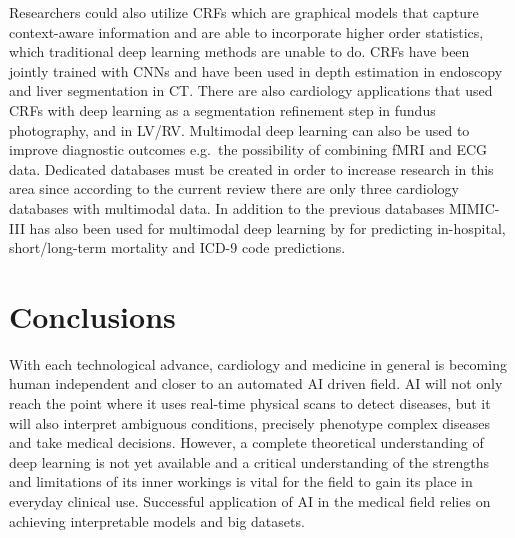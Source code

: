 \documentclass[journal]{IEEEtran}
\begin{document}
Researchers could also utilize CRFs which are graphical models that capture context-aware information and are able to incorporate higher order statistics, which traditional deep learning methods are unable to do.
CRFs have been jointly trained with CNNs and have been used in depth estimation in endoscopy\cite{mahmood2018deep} and liver segmentation in CT\cite{christ2016automatic}.
There are also cardiology applications that used CRFs with deep learning as a segmentation refinement step in fundus photography\cite{zhou2017improving, fu2016retinal}, and in LV/RV\cite{bai2017semi}.
Multimodal deep learning\cite{ngiam2011multimodal} can also be used to improve diagnostic outcomes e.g.\ the possibility of combining fMRI and ECG data.
Dedicated databases must be created in order to increase research in this area since according to the current review there are only three cardiology databases with multimodal data.
In addition to the previous databases MIMIC-III has also been used for multimodal deep learning by \cite{purushotham2018benchmarking} for predicting in-hospital, short/long-term mortality and ICD-9 code predictions.

\section*{Conclusions}
With each technological advance, cardiology and medicine in general is becoming human independent and closer to an automated AI driven field.
AI will not only reach the point where it uses real-time physical scans to detect diseases, but it will also interpret ambiguous conditions, precisely phenotype complex diseases and take medical decisions.
However, a complete theoretical understanding of deep learning is not yet available and a critical understanding of the strengths and limitations of its inner workings is vital for the field to gain its place in everyday clinical use.
Successful application of AI in the medical field relies on achieving interpretable models and big datasets.

\clearpage{}


\end{document}
